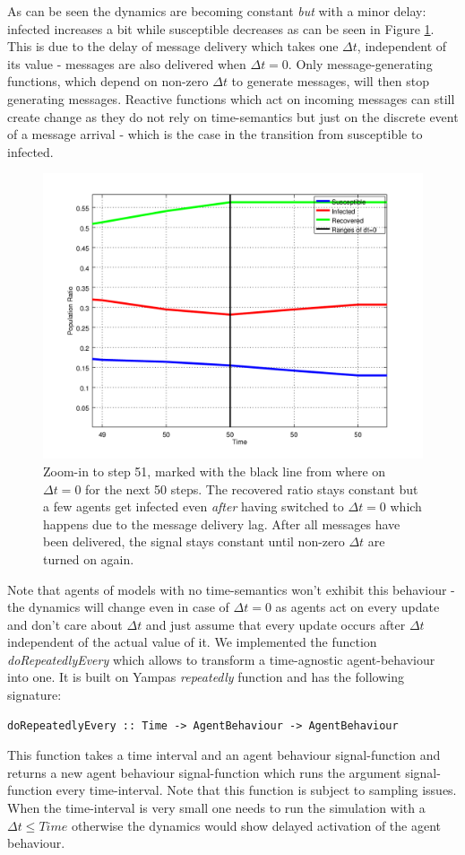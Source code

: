 As can be seen  the dynamics are becoming constant \textit{but} with a minor delay: infected increases a bit while susceptible decreases as can be seen in Figure \ref{fig:sir_abs_zero_dt_zoom}. This is due to the delay of message delivery which takes one $\Delta t$, independent of its value - messages are also delivered when $\Delta t = 0$. Only message-generating functions, which depend on non-zero $\Delta t$ to generate messages, will then stop generating messages. Reactive functions which act on incoming messages can still create change as they do not rely on time-semantics but just on the discrete event of a message arrival - which is the case in the transition from susceptible to infected.

\begin{figure}
	\centering
	\includegraphics[width=.4\textwidth, angle=0]{./../shared/fig/dtzero/SIR_ABS_zeroDt_mid_zoom.png}
	\caption{Zoom-in to step 51, marked with the black line from where on $\Delta t = 0$ for the next 50 steps. The recovered ratio stays constant but a few agents get infected even \textit{after} having switched to $\Delta t = 0$ which happens due to the message delivery lag. After all messages have been delivered, the signal stays constant until non-zero $\Delta t$ are turned on again.}
	\label{fig:sir_abs_zero_dt_zoom}
\end{figure}

Note that agents of models with no time-semantics won't exhibit this behaviour - the dynamics will change even in case of $\Delta t = 0$ as agents act on every update and don't care about $\Delta t$ and just assume that every update occurs after $\Delta t$ independent of the actual value of it. We implemented the function \textit{doRepeatedlyEvery} which allows to transform a time-agnostic agent-behaviour into one. It is built on Yampas \textit{repeatedly} function and has the following signature:

\begin{verbatim}
doRepeatedlyEvery :: Time -> AgentBehaviour -> AgentBehaviour
\end{verbatim}

This function takes a time interval and an agent behaviour signal-function and returns a new agent behaviour signal-function which runs the argument signal-function every time-interval. Note that this function is subject to sampling issues. When the time-interval is very small one needs to run the simulation with a $\Delta t \leq Time$ otherwise the dynamics would show delayed activation of the agent behaviour.